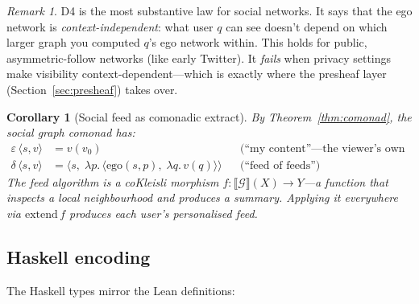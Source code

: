 \documentclass[11pt,a4paper]{article}
\theoremstyle{definition}
\theoremstyle{plain}
\newtheorem{corollary}[definition]{Corollary}
\theoremstyle{remark}
\newtheorem{remark}[definition]{Remark}
\newcommand{\ego}{\mathrm{ego}}
\begin{document}
\begin{remark}
D4 is the most substantive law for social networks. It says that the
ego network is \emph{context-independent}: what user $q$ can see
doesn't depend on which larger graph you computed $q$'s ego network
within. This holds for public, asymmetric-follow networks (like early
Twitter). It \emph{fails} when privacy settings make visibility
context-dependent---which is exactly where the presheaf layer
(Section~\ref{sec:presheaf}) takes over.
\end{remark}

\begin{corollary}[Social feed as comonadic extract]
By Theorem~\ref{thm:comonad}, the social graph comonad has:
\begin{align*}
  \varepsilon\,\langle s, v \rangle &= v(v_0) && \text{(``my content''---the viewer's own posts)} \\
  \delta\,\langle s, v \rangle &= \langle s,\; \lambda p.\, \langle \ego(s,p),\; \lambda q.\, v(q) \rangle \rangle && \text{(``feed of feeds'')}
\end{align*}
The \emph{feed algorithm} is a coKleisli morphism
$f : \llbracket \mathcal{G} \rrbracket(X) \to Y$---a function that
inspects a local neighbourhood and produces a summary. Applying it
everywhere via $\mathrm{extend}\,f$ produces each user's personalised
feed.
\end{corollary}

\subsection{Haskell encoding}

The Haskell types mirror the Lean definitions:
\end{document}
